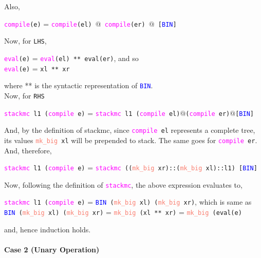\documentclass{article}
\begin{document}
    Also,
    \begin{center}
        \texttt{\textcolor{Fuchsia}{compile}(e)} = \texttt{\textcolor{Fuchsia}{compile}(el) $@$ \textcolor{Fuchsia}{compile}(er) $@$ [\textcolor{blue}{BIN}]}
    \end{center}
    Now, for \texttt{LHS},
    \begin{center}
        \texttt{\textcolor{Fuchsia}{eval}(e)} = \texttt{\textcolor{Fuchsia}{eval}(el) ** eval(er)}, and so \\
        \texttt{\textcolor{Fuchsia}{eval}(e)} = \texttt{xl ** xr}
    \end{center}
    where ** is the syntactic representation of \texttt{\textcolor{blue}{BIN}}. \\[5pt]
    Now, for \texttt{RHS}
    \begin{center}
        {\small \texttt{\textcolor{Fuchsia}{stackmc} l1 (\textcolor{Fuchsia}{compile} e)} = \texttt{\textcolor{Fuchsia}{stackmc} l1 (\textcolor{Fuchsia}{compile} el)$@$(\textcolor{Fuchsia}{compile} er)$@$[\textcolor{blue}{BIN}]}}
    \end{center}
    And, by the definition of stackmc, since \texttt{\textcolor{Fuchsia}{compile} el} represents a complete tree, its values \texttt{\textcolor{Salmon}{mk\_big} xl} will be prepended to stack. The same goes for \texttt{\textcolor{Fuchsia}{compile} er}. And, therefore,
    \begin{center}
        {\small \texttt{\textcolor{Fuchsia}{stackmc} l1 (\textcolor{Fuchsia}{compile} e)} = \texttt{\textcolor{Fuchsia}{stackmc} ((\textcolor{Salmon}{mk\_big} xr)::(\textcolor{Salmon}{mk\_big} xl)::l1) [\textcolor{blue}{BIN}]}}
    \end{center}
    Now, following the definition of \texttt{\textcolor{Fuchsia}{stackmc}}, the above expression evaluates to,
    \begin{center}
        {\texttt{\textcolor{Fuchsia}{stackmc} l1 (\textcolor{Fuchsia}{compile} e)} = \texttt{\textcolor{blue}{BIN} (\textcolor{Salmon}{mk\_big} xl) (\textcolor{Salmon}{mk\_big} xr)}}, {\tiny which is same as} \\[5pt]
        {\small \texttt{\textcolor{blue}{BIN} (\textcolor{Salmon}{mk\_big} xl) (\textcolor{Salmon}{mk\_big} xr)} = \texttt{\textcolor{Salmon}{mk\_big} (xl ** xr)} = \texttt{\textcolor{Salmon}{mk\_big} (eval(e)}}
    \end{center}
    and, hence induction holds. \\
\pagebreak
\\
\textbf{Case 2 (Unary Operation)} \\ [5 pt]
\end{document}
